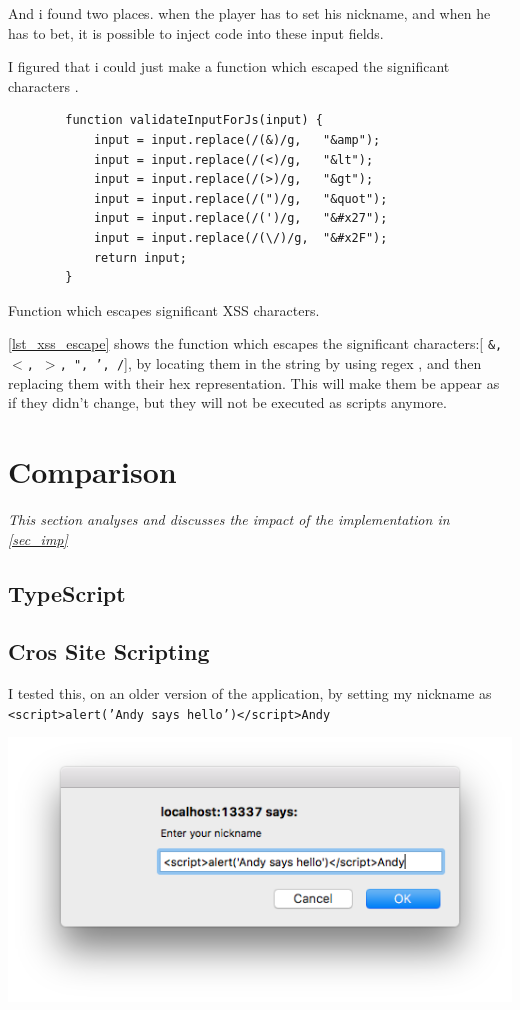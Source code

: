 \documentclass[a4paper]{article}
\begin{document}
And i found two places. when the player has to set his nickname, and when he has to bet, it is possible to inject code into these input fields.

I figured that i could just make a function which escaped the significant characters \cite{xss-prep}.

\begin{listing}[H]
\begin{verbatim}
        function validateInputForJs(input) {
            input = input.replace(/(&)/g,   "&amp");
            input = input.replace(/(<)/g,   "&lt");
            input = input.replace(/(>)/g,   "&gt");
            input = input.replace(/(")/g,   "&quot");
            input = input.replace(/(')/g,   "&#x27");
            input = input.replace(/(\/)/g,  "&#x2F");
            return input;
        }
\end{verbatim}
\caption{Function which escapes significant XSS characters.}
\label{lst_xss_escape}
\end{listing}

\autoref{lst_xss_escape} shows the function which escapes the significant characters:[ \texttt{\&, $<$, $>$, ", ', /}], by locating them in the string by using regex \cite{regex}, and then replacing them with their hex representation. This will make them be appear as if they didn't change, but they will not be executed as scripts anymore.




\section{Comparison}
\textit{This section analyses and discusses the impact of the implementation in \autoref{sec_imp}}


\subsection{TypeScript}
\subsection{Cros Site Scripting}
I tested this, on an older version of the application, by setting my nickname as \texttt{<script>alert('Andy says hello')</script>Andy}

\begin{center}
	\includegraphics[width=.5\textwidth]{images/xss_input}
\end{center}
\end{document}
